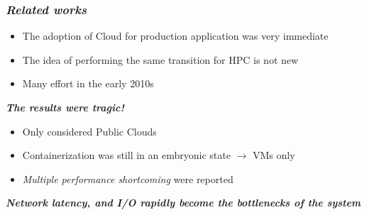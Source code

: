 \begin{frame}
  \frametitle{ \textit{Related works}}
  \begin{itemize}
    \itemsep0em
    \item The adoption of Cloud for production application was very immediate
    \item The idea of performing the \alert{same transition for HPC} is not new
    \item Many effort in the early 2010s
  \end{itemize}

  \pause

  \begin{block}{ \textit{\textbf{The results were tragic!}}}
    \begin{itemize}
      \itemsep0em
    \item Only considered \alert{Public Clouds}
    \item Containerization was still in an embryonic state $\to$ \alert{VMs only}
    \item \textit{Multiple performance shortcoming} were reported
    \end{itemize}
    {
       \textit{\textbf{
          Network latency, and I/O rapidly become the bottlenecks of the system
        }}
      }
  \end{block}
\end{frame}

